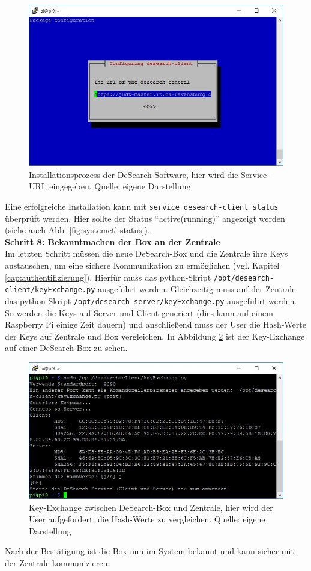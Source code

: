 \begin{figure}
	\centering
	\includegraphics[width=\textwidth]{images/installation2}
	\caption[Eingabe der Service-URL bei Installation der DeSearch-Software]{Installationsprozess der DeSearch-Software, hier wird die Service-URL eingegeben. Quelle: eigene Darstellung}
	\label{fig:installation2}
\end{figure}  
Eine erfolgreiche Installation kann mit \texttt{service desearch-client status} überprüft werden. Hier sollte der Status \enquote{active(running)} angezeigt werden (siehe auch Abb. \ref{fig:systemctl-status}).\\
\textbf{Schritt 8: Bekanntmachen der Box an der Zentrale}\\
Im letzten Schritt müssen die neue DeSearch-Box und die Zentrale ihre Keys austauschen, um eine sichere Kommunikation zu ermöglichen (vgl. Kapitel \ref{cap:authentifizierung}). Hierfür muss das python-Skript \texttt{/opt/desearch-client/keyExchange.py} ausgeführt werden. Gleichzeitig muss auf der Zentrale das python-Skript \texttt{/opt/desearch-server/keyExchange.py} ausgeführt werden. So werden die Keys auf Server und Client generiert (dies kann auf einem Raspberry Pi einige Zeit dauern) und anschließend muss der User die Hash-Werte der Keys auf Zentrale und Box vergleichen. In Abbildung \ref{fig:keyEx} ist der Key-Exchange auf einer DeSearch-Box zu sehen. 
\begin{figure}
	\centering
	\includegraphics[width=\textwidth]{images/keyExchange}
	\caption[Key-Exchange zwischen DeSearch-Box und Zentrale]{Key-Exchange zwischen DeSearch-Box und Zentrale, hier wird der User aufgefordert, die Hash-Werte zu vergleichen. Quelle: eigene Darstellung}
	\label{fig:keyEx}
\end{figure}
Nach der Bestätigung ist die Box nun im System bekannt und kann sicher mit der Zentrale kommunizieren.

